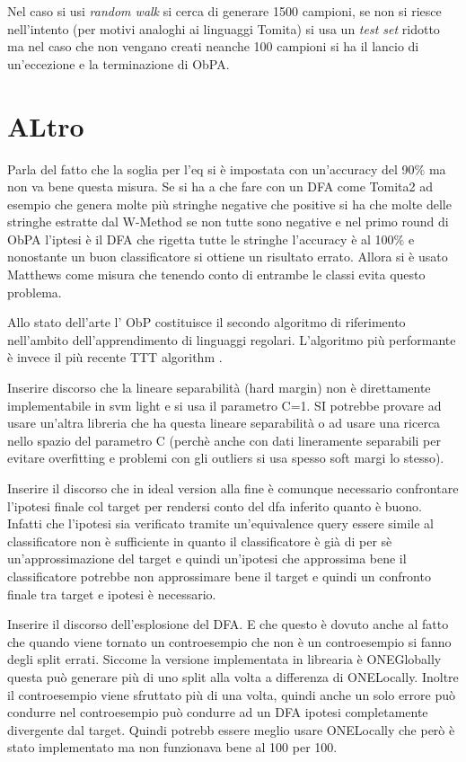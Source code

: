 Nel caso si usi \textit{random walk} si cerca di generare 1500 campioni, se non si riesce nell'intento (per motivi analoghi ai linguaggi Tomita) si usa un \textit{test set} ridotto ma nel caso che non vengano creati neanche 100 campioni si ha il lancio di un'eccezione e la terminazione di \ac{ObPA}.




\section{ALtro}
Parla del fatto che la soglia per l'eq si è impostata con un'accuracy del 90$\%$ ma non va bene questa misura. Se si ha a che fare con un \ac{DFA} come Tomita2 ad esempio che genera molte più stringhe negative che positive si ha che molte delle stringhe estratte dal W-Method se non tutte sono negative e nel primo round di \ac{ObPA} l'iptesi è il DFA che rigetta tutte le stringhe l'accuracy è al 100$\%$ e nonostante un buon classificatore si ottiene un risultato errato. Allora si è usato Matthews come misura che tenendo conto di entrambe le classi evita questo problema.

Allo stato dell'arte l' \ac{ObP} costituisce il secondo algoritmo di riferimento nell'ambito dell'apprendimento di linguaggi regolari.  L'algoritmo più performante è invece il più recente TTT algorithm \cite{SteffenTTT14}.

Inserire discorso che la lineare separabilità (hard margin) non è direttamente implementabile in svm light e si usa il parametro C=1. SI potrebbe provare ad usare un'altra libreria che ha questa lineare separabilità  o ad usare una ricerca nello spazio del parametro C (perchè anche con dati lineramente separabili per evitare overfitting e problemi con gli outliers si usa spesso soft margi lo stesso).

Inserire il discorso che in ideal version alla fine è comunque necessario confrontare l'ipotesi finale col target per rendersi conto del dfa inferito quanto è buono. Infatti che l'ipotesi sia verificato tramite un'equivalence query essere simile al classificatore non è sufficiente in quanto il classificatore è già di per sè un'approssimazione del target e quindi un'ipotesi che approssima bene il classificatore potrebbe non approssimare bene il target e quindi un confronto finale tra target e ipotesi è necessario. 

Inserire il discorso dell'esplosione del DFA. E che questo è dovuto anche al fatto che quando viene tornato un controesempio che non è un controesempio si fanno degli split errati. Siccome la versione implementata in librearia è ONEGlobally questa può generare più di uno split alla volta a differenza di ONELocally. Inoltre il controesempio viene sfruttato più di una volta, quindi anche un solo errore può condurre nel controesempio può condurre ad un DFA ipotesi completamente divergente dal target. Quindi potrebb essere meglio usare ONELocally che però è stato implementato ma non funzionava bene al 100 per 100.

